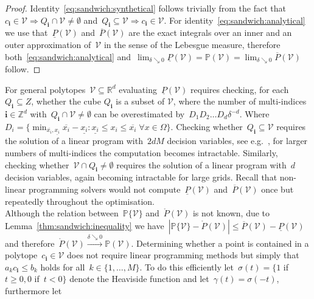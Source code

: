 \documentclass[letterpaper, 10pt, conference]{ieeeconf} %
\providecommand{\abs}[1]{\left\lvert#1\right\rvert}
\providecommand{\bfa}[1]{\mathbf{#1}}
\begin{document}
%
\begin{proof}
Identity~\eqref{eq:sandwich:synthetical} follows trivially from the fact that~$c_\bfa{i}\in\mathcal V\Rightarrow Q_\bfa{i}\cap\mathcal V\neq\emptyset$ and~$Q_\bfa{i}\subseteq\mathcal V\Rightarrow c_\bfa{i}\in\mathcal V$.
%
For identity~\eqref{eq:sandwich:analytical} we use that~$\underline P(\mathcal V)$ and~$\overline{P}(\mathcal V)$ are the exact integrals over an inner and an outer approximation of~$\mathcal V$ in the sense of the Lebesgue measure, therefore both~\eqref{eq:sandwich:analytical} and~$\lim_{\delta\searrow0}\underline{P}(\mathcal V)=\mathbb{P}(\mathcal V)=\lim_{\delta\searrow0}\overline{P}(\mathcal V)$ follow.
\end{proof}
%
For general polytopes~$\mathcal V\subseteq\mathbb R^d$ evaluating~$\underline{P}(\mathcal V)$ requires checking, for each $Q_{\bfa i} \subseteq Z$, whether the cube $Q_{\bfa i}$ is a subset of $\mathcal{V}$, where the number of multi-indices~$\bfa{i}\in\mathbb Z^d$ with~$Q_\bfa{i}\cap\mathcal V\neq\emptyset$ can be overestimated by~$D_1D_2\dots D_d \delta^{-d}$.
%
Where $D_i = \{\min_{\overline{x_i},\underline{x_i}} \overline{x_i}-\underline{x_i} : \underline{x_i}\leq x_i\leq\overline{x_i}\; \forall x\in\Omega\}$.
%
Checking whether~$Q_\bfa{i}\subseteq\mathcal V$ requires the solution of a linear program with~$2dM$ decision variables, see e.g.~\cite{Schaich:thesis}, for larger numbers of multi-indices the computation becomes intractable.
%
Similarly, checking whether~$\mathcal V\cap Q_\bfa{i}\neq\emptyset$ requires the solution of a linear program with~$d$ decision variables, again becoming intractable for large grids.
%
Recall that non-linear programming solvers would not compute~$\underline{P}(\mathcal V)$ and~$\overline{P}(\mathcal V)$ once but repeatedly throughout the optimisation.
%
\\[1em]
%
Although the relation between~$\mathbb P\{\mathcal V\}$ and~$\mathring{P}(\mathcal V)$ is not known, due to Lemma~\ref{thm:sandwich:inequality} we have~$\abs{\mathbb P\{\mathcal V\}-\mathring{P}(\mathcal V)}\leq \overline{P}(\mathcal V)-\underline{P}(\mathcal V)$ and therefore~$\mathring{P}(\mathcal V)\xrightarrow{\delta\searrow0}\mathbb{P}(\mathcal V)$.
%
Determining whether a point is contained in a polytope~$c_\bfa{i}\in\mathcal V$ does not require linear programming methods but simply that $a_k c_\bfa{i}\leq b_k$ holds for all~$k\in\{1,\dots,M\}$.
%
To do this efficiently let~$\sigma(t)=\{1$ if~$t\geq0, 0$ if~$t<0\}$ denote the Heaviside function and let~$\gamma(t) = \sigma(-t)$, furthermore let
\end{document}
